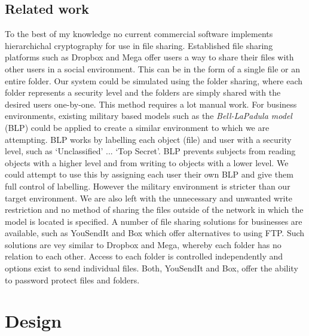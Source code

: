 \documentclass[12pt, titlepage]{article}
\begin{document}
\subsection{Related work}
To the best of my knowledge no current commercial software implements hierarchichal cryptography for use in file sharing.
\newline \indent Established file sharing platforms such as Dropbox and Mega offer users a way to share their files with other users in a social environment. This can be in the form of a single file or an entire folder. Our system could be simulated using the folder sharing, where each folder represents a security level and the folders are simply shared with the desired users one-by-one. This method requires a lot manual work.
\newline \indent For business environments, existing military based models such as the \textit{Bell-LaPadula model} (BLP) could be applied to create a similar environment to which we are attempting. BLP works by labelling each object (file) and user with a security level, such as `Unclassified' ... `Top Secret'. BLP prevents subjects from reading objects with a higher level and from writing to objects with a lower level. We could attempt to use this by assigning each user their own BLP and give them full control of labelling. However the military environment is stricter than our target environment. We are also left with the unnecessary and unwanted write restriction and no method of sharing the files outside of the network in which the model is located is specified.
\newline \indent A number of file sharing solutions for businesses are available, such as YouSendIt and Box which offer alternatives to using FTP. Such solutions are vey similar to Dropbox and Mega, whereby each folder has no relation to each other. Access to each folder is controlled independently and options exist to send individual files. Both, YouSendIt and Box, offer the ability to password protect files and folders.

\newpage
\section{Design}
\end{document}
